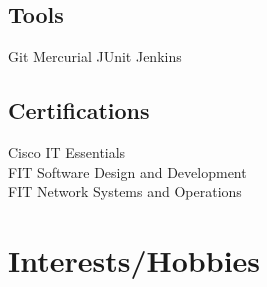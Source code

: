 \documentclass[]{deedy-resume-openfont}
\begin{document}
\begin{minipage}[t]{0.33\textwidth}
\subsection{Tools}
Git \textbullet{} Mercurial \textbullet{} JUnit \textbullet{} Jenkins \\
\vspace{1mm}
\sectionsep



\subsection{Certifications}
Cisco IT Essentials\\
FIT Software Design and Development \\
FIT Network Systems and Operations \\
\sectionsep

\section{Interests/Hobbies}




\end{minipage}
\end{document}
